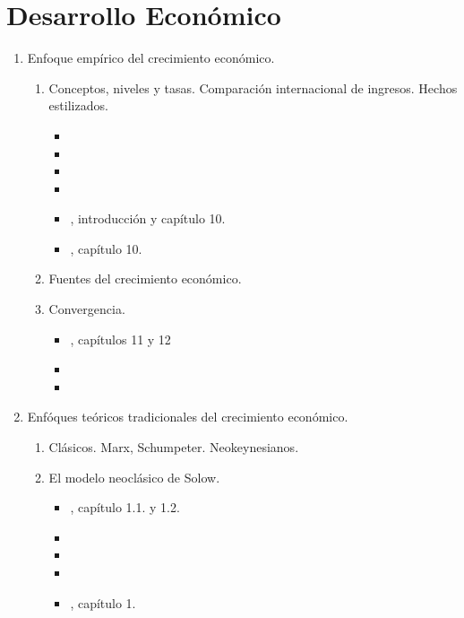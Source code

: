 \documentclass[10pt,a4paper]{article}
\begin{document}
\section{Desarrollo Económico}
\begin{enumerate}
	\item Enfoque empírico del crecimiento económico.
		\begin{enumerate}
			\item Conceptos, niveles y tasas. Comparación internacional de ingresos. Hechos estilizados.
				\begin{itemize}
					\item {}
					\item {}
					\item {}
					\item {}
					\item {}, introducción y capítulo 10.
					\item {}, capítulo 10.
				\end{itemize}
			\item Fuentes del crecimiento económico.
			\item Convergencia.
				\begin{itemize}
					\item {}, capítulos 11 y 12
					\item {}
					\item {}
				\end{itemize}
		\end{enumerate}
	\item Enfóques teóricos tradicionales del crecimiento económico.
		\begin{enumerate}
			\item Clásicos. Marx, Schumpeter. Neokeynesianos.
			\item El modelo neoclásico de Solow.
				\begin{itemize}
		 			\item {}, capítulo 1.1. y 1.2.
					\item {}
					\item {}
					\item {}
					\item {}, capítulo 1.
				\end{itemize}

\end{enumerate}
\end{enumerate}
\end{document}
